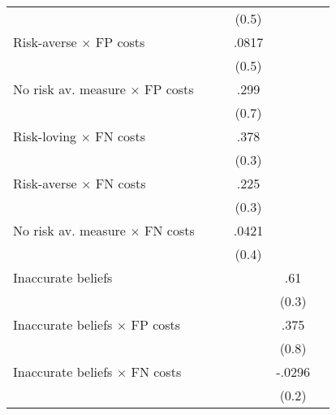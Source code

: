 \begin{table}[htbp]
\begin{tabular}{l*{5}{c}}
                &                  &                  &    (0.5)         &                  &                  \\
Risk-averse $\times$ FP costs&                  &                  &    .0817         &                  &                  \\
                &                  &                  &    (0.5)         &                  &                  \\
No risk av. measure $\times$ FP costs&                  &                  &     .299         &                  &                  \\
                &                  &                  &    (0.7)         &                  &                  \\
Risk-loving $\times$ FN costs&                  &                  &     .378         &                  &                  \\
                &                  &                  &    (0.3)         &                  &                  \\
Risk-averse $\times$ FN costs&                  &                  &     .225         &                  &                  \\
                &                  &                  &    (0.3)         &                  &                  \\
No risk av. measure $\times$ FN costs&                  &                  &    .0421         &                  &                  \\
                &                  &                  &    (0.4)         &                  &                  \\
Inaccurate beliefs&                  &                  &                  &      .61\sym{**} &                  \\
                &                  &                  &                  &    (0.3)         &                  \\
Inaccurate beliefs $\times$ FP costs&                  &                  &                  &     .375         &                  \\
                &                  &                  &                  &    (0.8)         &                  \\
Inaccurate beliefs $\times$ FN costs&                  &                  &                  &   -.0296         &                  \\
                &                  &                  &                  &    (0.2)         &                  \\

\end{tabular}
\end{table}
